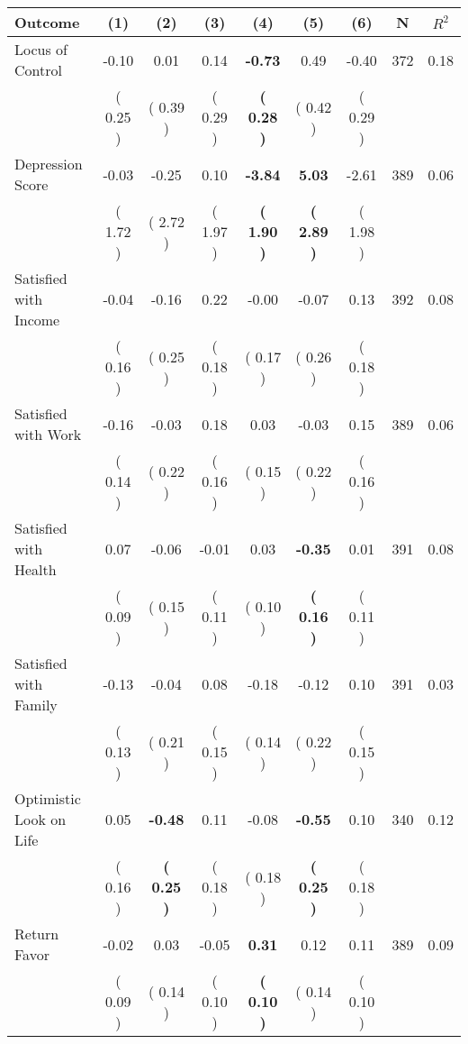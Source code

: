 \begin{tabular}{lcccccccc}
\toprule
 \textbf{Outcome} & \textbf{(1)} & \textbf{(2)} & \textbf{(3)} & \textbf{(4)} & \textbf{(5)} & \textbf{(6)} & \textbf{N} & \textbf{$ R^2$} \\
\midrule
Locus of Control &     -0.10 &      0.01 &      0.14 & \textbf{    -0.73} &      0.49 &     -0.40 & 372 &       0.18 \\ 
 & (     0.25 ) & (     0.39 ) & (     0.29 ) & \textbf{(     0.28 )} & (     0.42 ) & (     0.29 ) & \\
Depression Score &     -0.03 &     -0.25 &      0.10 & \textbf{    -3.84} & \textbf{     5.03} &     -2.61 & 389 &       0.06 \\ 
 & (     1.72 ) & (     2.72 ) & (     1.97 ) & \textbf{(     1.90 )} & \textbf{(     2.89 )} & (     1.98 ) & \\
Satisfied with Income &     -0.04 &     -0.16 &      0.22 &     -0.00 &     -0.07 &      0.13 & 392 &       0.08 \\ 
 & (     0.16 ) & (     0.25 ) & (     0.18 ) & (     0.17 ) & (     0.26 ) & (     0.18 ) & \\
Satisfied with Work &     -0.16 &     -0.03 &      0.18 &      0.03 &     -0.03 &      0.15 & 389 &       0.06 \\ 
 & (     0.14 ) & (     0.22 ) & (     0.16 ) & (     0.15 ) & (     0.22 ) & (     0.16 ) & \\
Satisfied with Health &      0.07 &     -0.06 &     -0.01 &      0.03 & \textbf{    -0.35} &      0.01 & 391 &       0.08 \\ 
 & (     0.09 ) & (     0.15 ) & (     0.11 ) & (     0.10 ) & \textbf{(     0.16 )} & (     0.11 ) & \\
Satisfied with Family &     -0.13 &     -0.04 &      0.08 &     -0.18 &     -0.12 &      0.10 & 391 &       0.03 \\ 
 & (     0.13 ) & (     0.21 ) & (     0.15 ) & (     0.14 ) & (     0.22 ) & (     0.15 ) & \\
Optimistic Look on Life &      0.05 & \textbf{    -0.48} &      0.11 &     -0.08 & \textbf{    -0.55} &      0.10 & 340 &       0.12 \\ 
 & (     0.16 ) & \textbf{(     0.25 )} & (     0.18 ) & (     0.18 ) & \textbf{(     0.25 )} & (     0.18 ) & \\
Return Favor &     -0.02 &      0.03 &     -0.05 & \textbf{     0.31} &      0.12 &      0.11 & 389 &       0.09 \\ 
 & (     0.09 ) & (     0.14 ) & (     0.10 ) & \textbf{(     0.10 )} & (     0.14 ) & (     0.10 ) & \\

\end{tabular}
